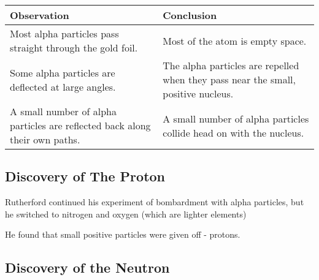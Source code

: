 \begin{longtable}[]{@{}ll@{}}
\toprule
\begin{minipage}[b]{0.45\columnwidth}\raggedright
\textbf{Observation}\strut
\end{minipage} & \begin{minipage}[b]{0.49\columnwidth}\raggedright
\textbf{Conclusion}\strut
\end{minipage}\tabularnewline
\midrule
\endhead
\begin{minipage}[t]{0.45\columnwidth}\raggedright
Most alpha particles pass straight through the gold foil.\strut
\end{minipage} & \begin{minipage}[t]{0.49\columnwidth}\raggedright
Most of the atom is empty space.\strut
\end{minipage}\tabularnewline
\begin{minipage}[t]{0.45\columnwidth}\raggedright
Some alpha particles are deflected at large angles.\strut
\end{minipage} & \begin{minipage}[t]{0.49\columnwidth}\raggedright
The alpha particles are repelled when they pass near the small, positive
nucleus.\strut
\end{minipage}\tabularnewline
\begin{minipage}[t]{0.45\columnwidth}\raggedright
A small number of alpha particles are reflected back along their own
paths.\strut
\end{minipage} & \begin{minipage}[t]{0.49\columnwidth}\raggedright
A small number of alpha particles collide head on with the
nucleus.\strut
\end{minipage}\tabularnewline
\bottomrule
\end{longtable}

\hypertarget{discovery-of-the-proton}{%
\subsection{Discovery of The Proton}\label{discovery-of-the-proton}}

Rutherford continued his experiment of bombardment with alpha particles,
but he switched to nitrogen and oxygen (which are lighter elements)

He found that small positive particles were given off - protons.

\hypertarget{discovery-of-the-neutron}{%
\subsection{Discovery of the Neutron}\label{discovery-of-the-neutron}}

